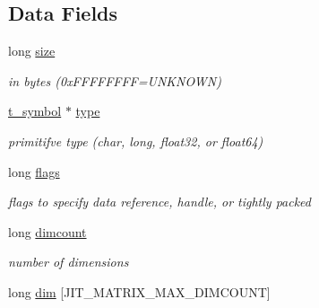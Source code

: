 \subsection*{Data Fields}
\begin{DoxyCompactItemize}
\item 
\hypertarget{structt__jit__matrix__info_ae7be653bb78fbafef7a38908ca9ac04a}{
long \hyperlink{structt__jit__matrix__info_ae7be653bb78fbafef7a38908ca9ac04a}{size}}
\label{structt__jit__matrix__info_ae7be653bb78fbafef7a38908ca9ac04a}

\begin{DoxyCompactList}\small\item\em in bytes (0xFFFFFFFF=UNKNOWN) \item\end{DoxyCompactList}\item 
\hypertarget{structt__jit__matrix__info_a37a2ef0a44ee55587b56b2fea63ef217}{
\hyperlink{structt__symbol}{t\_\-symbol} $\ast$ \hyperlink{structt__jit__matrix__info_a37a2ef0a44ee55587b56b2fea63ef217}{type}}
\label{structt__jit__matrix__info_a37a2ef0a44ee55587b56b2fea63ef217}

\begin{DoxyCompactList}\small\item\em primitifve type (char, long, float32, or float64) \item\end{DoxyCompactList}\item 
\hypertarget{structt__jit__matrix__info_a9f6af750379dbbbe72d86c5793912f26}{
long \hyperlink{structt__jit__matrix__info_a9f6af750379dbbbe72d86c5793912f26}{flags}}
\label{structt__jit__matrix__info_a9f6af750379dbbbe72d86c5793912f26}

\begin{DoxyCompactList}\small\item\em flags to specify data reference, handle, or tightly packed \item\end{DoxyCompactList}\item 
\hypertarget{structt__jit__matrix__info_a51f55844070b10955b23235f6ef68d1c}{
long \hyperlink{structt__jit__matrix__info_a51f55844070b10955b23235f6ef68d1c}{dimcount}}
\label{structt__jit__matrix__info_a51f55844070b10955b23235f6ef68d1c}

\begin{DoxyCompactList}\small\item\em number of dimensions \item\end{DoxyCompactList}\item 
\hypertarget{structt__jit__matrix__info_a500e46ec5cc4182111fb01931968c6d4}{
long \hyperlink{structt__jit__matrix__info_a500e46ec5cc4182111fb01931968c6d4}{dim} \mbox{[}JIT\_\-MATRIX\_\-MAX\_\-DIMCOUNT\mbox{]}}
\label{structt__jit__matrix__info_a500e46ec5cc4182111fb01931968c6d4}


\end{DoxyCompactItemize}
